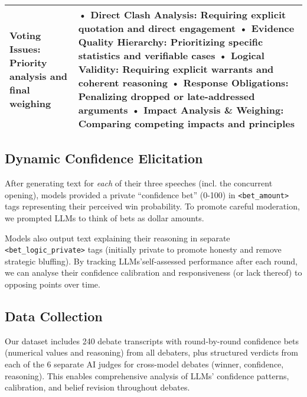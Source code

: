 \documentclass{article}
\begin{document}
\begin{table}[h]
\begin{tabular}{|p{}|p{}|}
\vspace{4pt}
\newline \textbf{Voting Issues}: Priority analysis and final weighing
&
• \textbf{Direct Clash Analysis}: Requiring explicit quotation and direct engagement
\newline • \textbf{Evidence Quality Hierarchy}: Prioritizing specific statistics and verifiable cases
\newline • \textbf{Logical Validity}: Requiring explicit warrants and coherent reasoning
\newline • \textbf{Response Obligations}: Penalizing dropped or late-addressed arguments
\newline • \textbf{Impact Analysis \& Weighing}: Comparing competing impacts and principles
\\
\hline
\end{tabular}
\end{table}

\subsection{Dynamic Confidence Elicitation}
\label{subsec:confidence_elicitation}

After generating text for \textit{each} of their three speeches (incl. the concurrent opening), models provided a private ``confidence bet'' (0-100) in \texttt{\textless bet\_amount\textgreater} tags representing their perceived win probability. To promote careful moderation, we prompted LLMs to think of bets as dollar amounts.

Models also output text explaining their reasoning in separate \texttt{\textless bet\_logic\_private\textgreater} tags (initially private to promote honesty and remove strategic bluffing). By tracking LLMs'self-assessed performance after each round, we can analyse their confidence calibration and responsiveness (or lack thereof) to opposing points over time.

\subsection{Data Collection}
\label{subsec:data_collection}
Our dataset includes 240 debate transcripts with round-by-round confidence bets (numerical values and reasoning) from all debaters, plus structured verdicts from each of the 6 separate AI judges for cross-model debates (winner, confidence, reasoning). This enables comprehensive analysis of LLMs' confidence patterns, calibration, and belief revision throughout debates.
\end{document}
